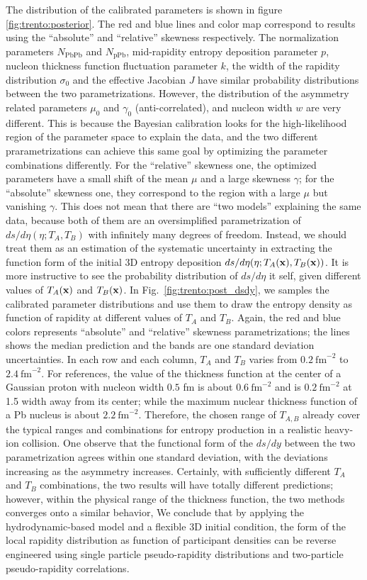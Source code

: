 The distribution of the calibrated parameters is shown in figure \ref{fig:trento:posterior}.
The red and blue lines and color map correspond to results using the ``absolute'' and ``relative'' skewness respectively.
The normalization parameters $N_{\textrm{PbPb}}$ and $N_{\textrm{pPb}}$, mid-rapidity entropy deposition parameter $p$, nucleon thickness function fluctuation parameter $k$, the width of the rapidity distribution $\sigma_0$ and the effective Jacobian $J$ have similar probability distributions between the two parametrizations.
However, the distribution of the asymmetry related parameters $\mu_0$ and $\gamma_0$ (anti-correlated), and nucleon width $w$ are very different.
This is because the Bayesian calibration looks for the high-likelihood region of the parameter space to explain the data, and the two different prarametrizations can achieve this same goal by optimizing the parameter combinations differently.
For the ``relative'' skewness one, the optimized parameters have a small shift of the mean $\mu$ and a large skewness $\gamma$; for the ``absolute'' skewness one, they correspond to the region with a large $\mu$ but vanishing $\gamma$.
This does not mean that there are ``two models'' explaining the same data, because both of them are an oversimplified parametrization of $ds/d\eta(\eta; T_A, T_B)$ with infinitely many degrees of freedom. 
Instead, we should treat them as an estimation of the systematic uncertainty in extracting the function form of the initial 3D entropy deposition $ds/d\eta(\eta; T_A(\mathbf x), T_B(\mathbf x))$.
It is more instructive to see the probability distribution of $ds/d\eta$ it self, given different values of $T_A(\mathbf x)$ and $T_B(\mathbf x)$.
In Fig.~\ref{fig:trento:post_dsdy}, we samples the calibrated parameter distributions and use them to draw the entropy density as function of rapidity at different values of $T_A$ and $T_B$. 
Again, the red and blue colors represents ``absolute'' and ``relative'' skewness parametrizations; the lines shows the median prediction and the bands are one standard deviation uncertainties. 
In each row and each column, $T_A$ and $T_B$ varies from $0.2~\text{fm}^{-2}$ to $2.4~\text{fm}^{-2}$. 
For references, the value of the thickness function at the center of a Gaussian proton with nucleon width $0.5$ fm is about $0.6~\text{fm}^{-2}$ and is $0.2~\text{fm}^{-2}$  at 1.5 width away from its center; while the maximum nuclear thickness function of a Pb nucleus is about $2.2~\text{fm}^{-2}$.
Therefore, the chosen range of $T_{A,B}$ already cover the typical ranges and combinations for entropy production in a realistic heavy-ion collision.
One observe that the functional form of the $ds/dy$ between the two parametrization agrees within one standard deviation, with the deviations increasing as the asymmetry increases.
Certainly, with sufficiently different $T_A$ and $T_B$ combinations, the two results will have totally different predictions; however, within the physical range of the thickness function, the two methods converges onto a similar behavior,
We conclude that by applying the hydrodynamic-based model and a flexible 3D initial condition, the form of the local rapidity distribution as function of participant densities can be reverse engineered using single particle pseudo-rapidity distributions and two-particle pseudo-rapidity correlations.

